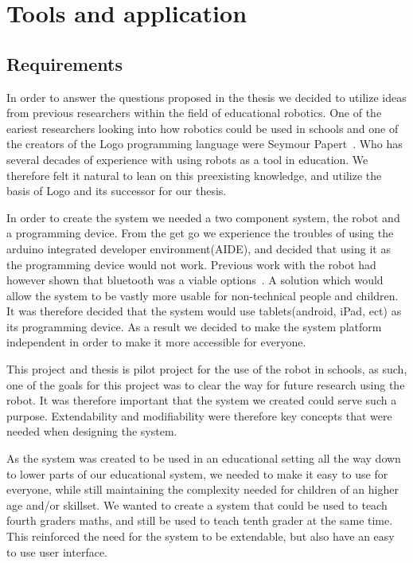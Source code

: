 \section{Tools and application}
	\subsection{Requirements}
In order to answer the questions proposed in the thesis we decided to utilize ideas from previous researchers within the field of educational robotics. 
One of the eariest researchers looking into how robotics could be used in schools and one of the creators of the Logo programming language were Seymour Papert~\cite{papert1980mindstorms}. Who has several decades of experience with using robots as a tool in education.
We therefore felt it natural to lean on this preexisting knowledge, and utilize the basis of Logo and its successor for our thesis.

\bigskip\noindent
In order to create the system we needed a two component system, the \chirp robot and a programming device. 
From the get go we experience the troubles of using the arduino integrated developer environment(AIDE), and decided that using it as the programming device would not work.
Previous work with the robot had however shown that bluetooth was a viable options~\cite{chrip2013ResearcherNight}.
A solution which would allow the system to be vastly more usable for non-technical people and children. 
It was therefore decided that the system would use tablets(android, iPad, ect) as its programming device.
As a result we decided to make the system platform independent in order to make it more accessible for everyone. 

\bigskip\noindent
This project and thesis is pilot project for the use of the \chirp robot in schools, as such,
one of the goals for this project was to clear the way for future research using the \chirp robot.
It was therefore important that the system we created could serve such a purpose.
Extendability and modifiability were therefore key concepts that were needed when designing the system.

\bigskip\noindent
As the system was created to be used in an educational setting all the way down to lower parts of our educational system, 
we needed to make it easy to use for everyone, while still maintaining the complexity needed for children of an higher age and/or skillset. 
We wanted to create a system that could be used to teach fourth graders maths, and still be used to teach tenth grader at the same time. 
This reinforced the need for the system to be extendable, but also have an easy to use user interface. 


